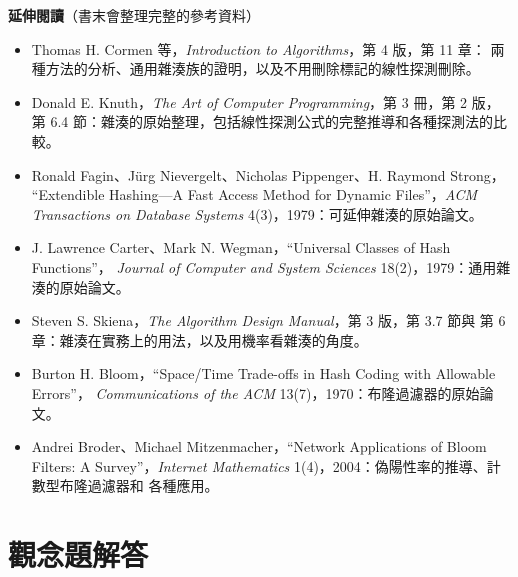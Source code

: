 \textbf{延伸閱讀}（書末會整理完整的參考資料）

\begin{itemize}
\item Thomas H. Cormen 等，\textit{Introduction to Algorithms}，第 4 版，第 11 章：
兩種方法的分析、通用雜湊族的證明，以及不用刪除標記的線性探測刪除。
\item Donald E. Knuth，\textit{The Art of Computer Programming}，第 3 冊，第 2 版，
第 6.4 節：雜湊的原始整理，包括線性探測公式的完整推導和各種探測法的比較。
\item Ronald Fagin、Jürg Nievergelt、Nicholas Pippenger、H. Raymond Strong，
``Extendible Hashing---A Fast Access Method for Dynamic Files''，\textit{ACM
Transactions on Database Systems} 4(3)，1979：可延伸雜湊的原始論文。
\item J. Lawrence Carter、Mark N. Wegman，``Universal Classes of Hash Functions''，
\textit{Journal of Computer and System Sciences} 18(2)，1979：通用雜湊的原始論文。
\item Steven S. Skiena，\textit{The Algorithm Design Manual}，第 3 版，第 3.7 節與
第 6 章：雜湊在實務上的用法，以及用機率看雜湊的角度。
\item Burton H. Bloom，``Space/Time Trade-offs in Hash Coding with Allowable Errors''，
\textit{Communications of the ACM} 13(7)，1970：布隆過濾器的原始論文。
\item Andrei Broder、Michael Mitzenmacher，``Network Applications of Bloom Filters: A
Survey''，\textit{Internet Mathematics} 1(4)，2004：偽陽性率的推導、計數型布隆過濾器和
各種應用。
\end{itemize}

\section*{觀念題解答}

